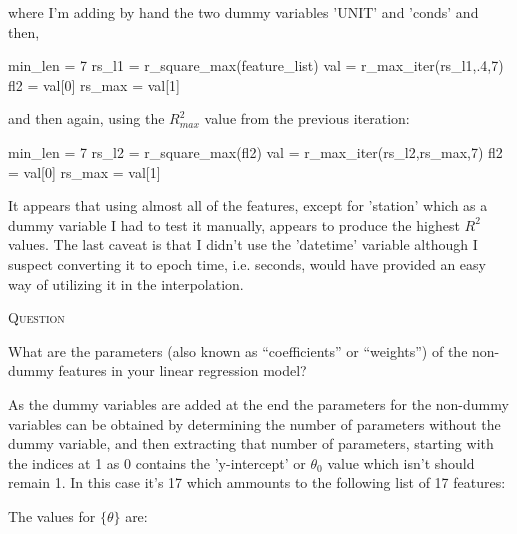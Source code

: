 \documentclass{article}
\newcounter{questionCtr}
\newenvironment{question}{%
   \bigskip\noindent%
   \refstepcounter{questionCtr}%
   \textsc{Question \thequestionCtr}%
   \newline%
   }{\par\bigskip}  %
\numberwithin{questionCtr}{section}
\numberwithin{problemCtr}{section}
\begin{document}
where I'm adding by hand the two dummy variables 'UNIT' and 'conds' and then,

\begin{python1}
  min_len = 7
  rs_l1 = r_square_max(feature_list)
  val = r_max_iter(rs_l1,.4,7)
  fl2 = val[0]
  rs_max = val[1]
\end{python1}

and then again, using the $R_{max}^2$ value from the previous iteration:

\begin{python1}
  min_len = 7
  rs_l2 = r_square_max(fl2)
  val = r_max_iter(rs_l2,rs_max,7)
  fl2 = val[0]
  rs_max = val[1]
\end{python1}

It appears that using almost all of the features, except for 'station' which as
a dummy variable I had to test it manually, appears to produce the highest $R^2$
values.  The last caveat is that I didn't use the 'datetime' variable although I
suspect converting it to epoch time, i.e. seconds, would have provided an easy
way of utilizing it in the interpolation.

\begin{question}
  What are the parameters (also known as ``coefficients'' or ``weights'') of the
  non-dummy features in your linear regression model?
\end{question}

As the dummy variables are added at the end the parameters for the non-dummy
variables can be obtained by determining the number of parameters without the
dummy variable, and then extracting that number of parameters, starting with
the indices at 1 as 0 contains the 'y-intercept' or $\theta_0$ value which isn't
should remain 1.  In this case it's 17 which ammounts to the following list of
17 features:

\begin{python1}
\end{python1}

The values for $\{\theta\}$ are:

\begin{python1}
[   43.15215935  1095.13586939  2191.2348662  -1867.70463212  -114.92320615
 -2764.85499069  -441.17345176  -107.81100064    39.01877468    12.56298462
  8871.15668632  -126.41631315   -55.66694997   -25.83967506  1337.26604487
 -2320.43792845 -1339.93169656] 
\end{python1}
\end{document}
